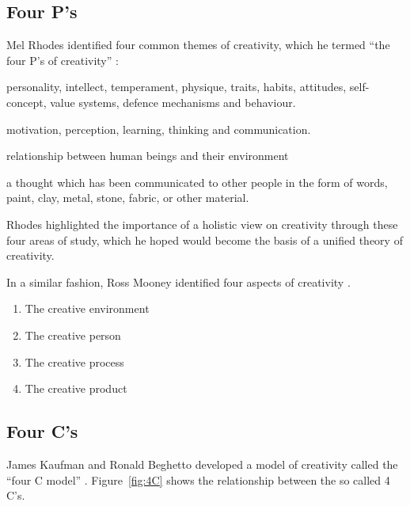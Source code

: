 \subsection{Four P's}
\label{s:fourp}

Mel Rhodes identified four common themes of creativity, which he termed ``the four P\rq s of creativity'' \autocite*{Rhodes1961}:

\begin{description}[leftmargin=2.5cm]
  \item [Persons] personality, intellect, temperament, physique, traits, habits, attitudes, self-concept, value systems, defence mechanisms and behaviour.
  \item [Process] motivation, perception, learning, thinking and communication.
  \item [Press] relationship between human beings and their environment
  \item [Products] a thought which has been communicated to other people in the form of words, paint, clay, metal, stone, fabric, or other material.
\end{description}

Rhodes highlighted the importance of a holistic view on creativity through these four areas of study, which he hoped would become the basis of a unified theory of creativity.

In a similar fashion, Ross Mooney identified four aspects of creativity \autocite[as cited in][]{Sternberg1999}.

\begin{enumerate}
  \item The creative environment
  \item The creative person
  \item The creative process
  \item The creative product
\end{enumerate}


\subsection{Four C's}
\label{s:fourc}

James Kaufman and Ronald Beghetto developed a model of creativity called the ``four C model'' \autocite*{Kaufman2009}. Figure~\ref{fig:4C} shows the relationship between the so called 4 C's.

